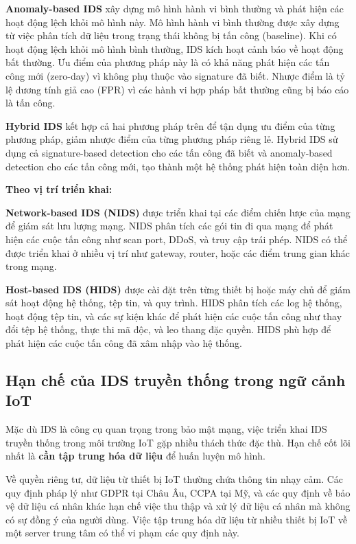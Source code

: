 \textbf{Anomaly-based IDS} xây dựng mô hình hành vi bình thường và phát hiện các hoạt động lệch khỏi mô hình này. Mô hình hành vi bình thường được xây dựng từ việc phân tích dữ liệu trong trạng thái không bị tấn công (baseline). Khi có hoạt động lệch khỏi mô hình bình thường, IDS kích hoạt cảnh báo về hoạt động bất thường. Ưu điểm của phương pháp này là có khả năng phát hiện các tấn công mới (zero-day) vì không phụ thuộc vào signature đã biết. Nhược điểm là tỷ lệ dương tính giả cao (FPR) vì các hành vi hợp pháp bất thường cũng bị báo cáo là tấn công.

\textbf{Hybrid IDS} kết hợp cả hai phương pháp trên để tận dụng ưu điểm của từng phương pháp, giảm nhược điểm của từng phương pháp riêng lẻ. Hybrid IDS sử dụng cả signature-based detection cho các tấn công đã biết và anomaly-based detection cho các tấn công mới, tạo thành một hệ thống phát hiện toàn diện hơn.

\textbf{Theo vị trí triển khai:}

\textbf{Network-based IDS (NIDS)} được triển khai tại các điểm chiến lược của mạng để giám sát lưu lượng mạng. NIDS phân tích các gói tin đi qua mạng để phát hiện các cuộc tấn công như scan port, DDoS, và truy cập trái phép. NIDS có thể được triển khai ở nhiều vị trí như gateway, router, hoặc các điểm trung gian khác trong mạng.

\textbf{Host-based IDS (HIDS)} được cài đặt trên từng thiết bị hoặc máy chủ để giám sát hoạt động hệ thống, tệp tin, và quy trình. HIDS phân tích các log hệ thống, hoạt động tệp tin, và các sự kiện khác để phát hiện các cuộc tấn công như thay đổi tệp hệ thống, thực thi mã độc, và leo thang đặc quyền. HIDS phù hợp để phát hiện các cuộc tấn công đã xâm nhập vào hệ thống.

\subsection{Hạn chế của IDS truyền thống trong ngữ cảnh IoT}
Mặc dù IDS là công cụ quan trọng trong bảo mật mạng, việc triển khai IDS truyền thống trong môi trường IoT gặp nhiều thách thức đặc thù. Hạn chế cốt lõi nhất là \textbf{cần tập trung hóa dữ liệu} để huấn luyện mô hình.

Về quyền riêng tư, dữ liệu từ thiết bị IoT thường chứa thông tin nhạy cảm. Các quy định pháp lý như GDPR tại Châu Âu, CCPA tại Mỹ, và các quy định về bảo vệ dữ liệu cá nhân khác hạn chế việc thu thập và xử lý dữ liệu cá nhân mà không có sự đồng ý của người dùng. Việc tập trung hóa dữ liệu từ nhiều thiết bị IoT về một server trung tâm có thể vi phạm các quy định này.

